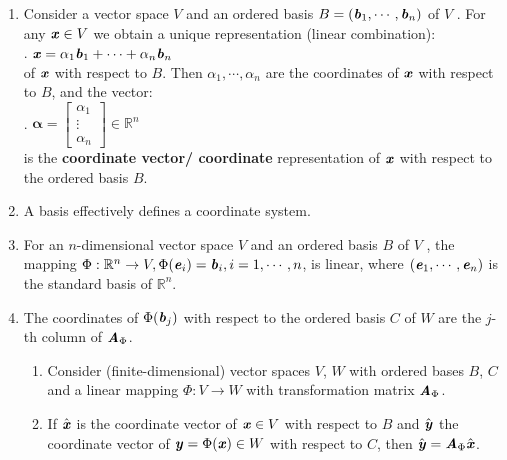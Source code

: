 \begin{enumerate}
    \item Consider a vector space $V$ and an ordered basis $B = (\text{\textbf{\textit{b}}}_1, \cdots , \text{\textbf{\textit{b}}}_n)$ of $V$ . 
    For any $\text{\textbf{\textit{x}}} \in V$ we obtain a unique representation (linear combination):
    \hfill \cite{mfml/book/mml/Deisenroth-Faisal-Ong}
    \\
    .\hfill
    $
        \text{\textbf{\textit{x}}} = \alpha_1 \text{\textbf{\textit{b}}}_1 + \cdots + \alpha_n \text{\textbf{\textit{b}}}_n
    $
    \hfill \cite{mfml/book/mml/Deisenroth-Faisal-Ong}
    \\
    of $\text{\textbf{\textit{x}}}$ with respect to $B$. 
    Then $\alpha_1, \cdots , \alpha_n$ are the coordinates of $\text{\textbf{\textit{x}}}$ with respect to $B$, and the vector:
    \hfill \cite{mfml/book/mml/Deisenroth-Faisal-Ong}
    \\
    .\hfill
    $
        \bm{\alpha} = \begin{bmatrix}
            \alpha_1 \\
            \vdots \\
            \alpha_n
        \end{bmatrix}
        \in \mathbb{R}^n
    $
    \hfill \cite{mfml/book/mml/Deisenroth-Faisal-Ong}
    \\
    is the \textbf{coordinate vector/ coordinate} representation of $\text{\textbf{\textit{x}}}$ with respect to the ordered basis $B$.
    \hfill \cite{mfml/book/mml/Deisenroth-Faisal-Ong}

    \item A basis effectively defines a coordinate system.
    \hfill \cite{mfml/book/mml/Deisenroth-Faisal-Ong}

    \item For an $n$-dimensional vector space $V$ and an ordered basis $B$ of $V$ , the mapping $\Phi : \mathbb{R}^n \to V , \Phi(\text{\textbf{\textit{e}}}_i) = \text{\textbf{\textit{b}}}_i , i = 1, \cdots , n$, is linear, where $(\text{\textbf{\textit{e}}}_1, \cdots , \text{\textbf{\textit{e}}}_n)$ is the standard basis of $\mathbb{R}^n$.
    \hfill \cite{mfml/book/mml/Deisenroth-Faisal-Ong}

    \item The coordinates of $\Phi(\text{\textbf{\textit{b}}}_j )$ with respect to the ordered basis $C$ of $W$ are the $j$-th column of $\text{\textbf{\textit{A}}}_\Phi$.
    \hfill \cite{mfml/book/mml/Deisenroth-Faisal-Ong}
    \hfill \cite{mfml/book/mml/Deisenroth-Faisal-Ong}
    \begin{enumerate}
        \item Consider (finite-dimensional) vector spaces $V$, $W$ with ordered bases $B$, $C$ and a linear mapping $\Phi : V \to W$ with transformation matrix $\text{\textbf{\textit{A}}}_\Phi$.
        \hfill \cite{mfml/book/mml/Deisenroth-Faisal-Ong}

        \item If $\hat{\text{\textbf{\textit{x}}}}$ is the coordinate vector of $\text{\textbf{\textit{x}}} \in V$ with respect to $B$ and $\hat{\text{\textbf{\textit{y}}}}$ the coordinate vector of $\text{\textbf{\textit{y}}} = \Phi(\text{\textbf{\textit{x}}}) \in W$ with respect to $C$, then $\hat{\text{\textbf{\textit{y}}}} = \text{\textbf{\textit{A}}}_\Phi \hat{\text{\textbf{\textit{x}}}}$.
        \hfill \cite{mfml/book/mml/Deisenroth-Faisal-Ong}
    \end{enumerate}    
\end{enumerate}

